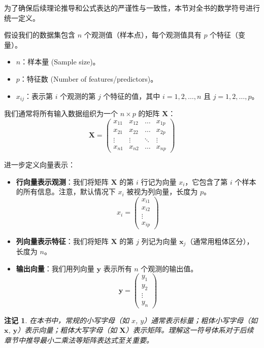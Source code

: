 \documentclass[UTF8]{ctexart}
\newtheorem{remark}{注记}[section]
\numberwithin{equation}{section}
\begin{document}
为了确保后续理论推导和公式表达的严谨性与一致性，本节对全书的数学符号进行统一定义。

假设我们的数据集包含 $n$ 个观测值（样本点），每个观测值具有 $p$ 个特征（变量）。
\begin{itemize}
    \item $n$：样本量 (Sample size)。
    \item $p$：特征数 (Number of features/predictors)。
    \item $x_{ij}$：表示第 $i$ 个观测的第 $j$ 个特征的值，其中 $i = 1, 2, \dots, n$ 且 $j = 1, 2, \dots, p$。
\end{itemize}

我们通常将所有输入数据组织为一个 $n \times p$ 的矩阵 $\mathbf{X}$：
\begin{equation}
\mathbf{X} = \begin{pmatrix} 
x_{11} & x_{12} & \dots & x_{1p} \\ 
x_{21} & x_{22} & \dots & x_{2p} \\ 
\vdots & \vdots & \ddots & \vdots \\ 
x_{n1} & x_{n2} & \dots & x_{np} 
\end{pmatrix}
\end{equation}

进一步定义向量表示：
\begin{itemize}
    \item \textbf{行向量表示观测}：我们将矩阵 $\mathbf{X}$ 的第 $i$ 行记为向量 $x_i$，它包含了第 $i$ 个样本的所有信息。注意，默认情况下 $x_i$ 被视为列向量，长度为 $p$。
    \begin{equation}
    x_i = \begin{pmatrix} x_{i1} \\ x_{i2} \\ \vdots \\ x_{ip} \end{pmatrix}
    \end{equation}
    \item \textbf{列向量表示特征}：我们将矩阵 $\mathbf{X}$ 的第 $j$ 列记为向量 $\mathbf{x}_j$（通常用粗体区分），长度为 $n$。
    \item \textbf{输出向量}：我们用列向量 $\mathbf{y}$ 表示所有 $n$ 个观测的输出值。
    \begin{equation}
    \mathbf{y} = \begin{pmatrix} y_1 \\ y_2 \\ \vdots \\ y_n \end{pmatrix}
    \end{equation}
\end{itemize}

\begin{remark}
在本书中，常规的小写字母（如 $x$, $y$）通常表示标量；粗体小写字母（如 $\mathbf{x}$, $\mathbf{y}$）表示向量；粗体大写字母（如 $\mathbf{X}$）表示矩阵。理解这一符号体系对于后续章节中推导最小二乘法等矩阵表达式至关重要。
\end{remark}
\end{document}
